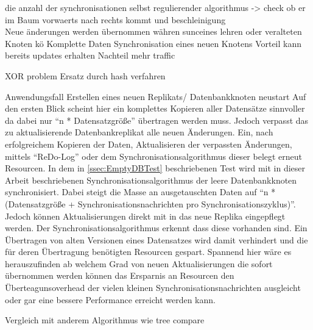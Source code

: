 \documentclass[a4paper,11pt,oneside,%
headsepline,												%
footsepline,												%
bibtotocnumbered									%
]{scrreprt}
\begin{document}
die anzahl der synchronisationen selbst regulierender algorithmus -> check ob er im Baum vorwaerts nach rechts kommt und beschleinigung\\

Neue änderungen werden übernommen währen sunceines lehren oder veralteten Knoten kö
Komplette Daten Synchronisation eines neuen Knotens Vorteil kann bereits updates erhalten Nachteil mehr traffic


XOR problem Ersatz durch hash verfahren

Anwendungsfall Erstellen eines neuen Replikats/ Datenbankknoten neustart
Auf den ersten Blick scheint hier ein komplettes Kopieren aller Datensätze sinnvoller da dabei nur \enquote{n * Datensatzgröße} übertragen werden muss. Jedoch verpasst das zu aktualisierende Datenbankreplikat alle neuen Änderungen. Ein, nach erfolgreichem Kopieren der Daten, Aktualisieren der verpassten Änderungen, mittels \enquote{ReDo-Log} oder dem Synchronisationsalgorithmus dieser belegt erneut Resourcen. In dem in \autoref{ssec:EmptyDBTest} beschriebenen Test wird mit in dieser Arbeit beschriebenen Synchronisationsalgorithmus der leere Datenbankknoten synchronisiert. Dabei steigt die Masse an ausgetauschten Daten auf \enquote{n * (Datensatzgröße + Synchronisationsnachrichten pro Synchronisationszyklus)}. Jedoch können Aktualisierungen direkt mit in das neue Replika eingepflegt werden. Der Synchronisationsalgorithmus erkennt dass diese vorhanden sind. Ein Übertragen von alten Versionen eines Datensatzes wird damit verhindert und die für deren Übertragung benötigten Resourcen gespart. Spannend hier wäre es herauszufinden ab welchem Grad von neuen Aktualisierungen die sofort übernommen werden können das Ersparnis an Resourcen den Überteagunsoverhead der vielen kleinen Synchronisationsnachrichten ausgleicht oder gar eine bessere Performance erreicht werden kann. 

Vergleich mit anderem Algorithmus wie tree compare
\newpage
\listoftodos[Notes]

\newpage
\begingroup
   \setlength{}
   \printbibheading
\printbibliography[type=book,heading=subbibliography,title={Buch Quellen}]
\printbibliography[nottype=book,heading=subbibliography,title={Online Quellen}]
\endgroup


\end{document}
